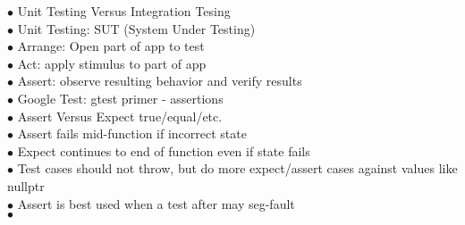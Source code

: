 \documentclass[11pt]{article}
\begin{document}
\indent $\bullet$ Unit Testing Versus Integration Tesing \\
\indent\indent $\bullet$ Unit Testing: SUT (System Under Testing)\\
\indent\indent\indent  $\bullet$ Arrange: Open part of app to test\\ 
\indent\indent\indent  $\bullet$ Act: apply stimulus to part of app \\
\indent\indent\indent  $\bullet$ Assert: observe resulting behavior and verify results  \\
\indent\indent $\bullet$ Google Test: gtest primer - assertions \\
\indent\indent $\bullet$ Assert Versus Expect true/equal/etc. \\
\indent\indent\indent $\bullet$ Assert fails mid-function if incorrect state \\
\indent\indent\indent $\bullet$ Expect continues to end of function even if state fails \\
\indent\indent $\bullet$ Test cases should not throw, but do more expect/assert cases against values like nullptr \\
\indent\indent $\bullet$ Assert is best used when a test after may seg-fault \\
\indent\indent $\bullet$


    
\end{document}
